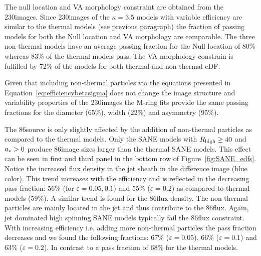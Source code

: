 
The null location and VA morphology constraint are obtained from the 230\GHz images.
Since 230\GHz images of the $\kappa=3.5$ models with variable efficiency are similar to the thermal models (see previous paragraph) the fraction of passing models for both the Null location and VA morphology are comparable.
The three non-thermal models have an average passing fraction for the Null location of 80\% whereas 83\% of the thermal models pass.
The VA morphology constrain is fulfilled by 72\% of the models for both thermal and non-thermal eDF.


Given that including non-thermal particles via the equations presented in Equation~\ref{eq:efficiencybetasigma} does not change the image structure and variability properties of the 230\GHz images the M-ring fits provide the same passing fractions for the diameter (65\%), width (22\%) and asymmetry (95\%).


The 86\GHz source is only slightly affected by the addition of non-thermal particles as compared to the thermal models.
Only the SANE models with $R_\mathrm{high} \geq 40$ and $a_* > 0$ produce 86\GHz image sizes larger than the thermal SANE models.
This effect can be seen in  first and third panel in the bottom row of Figure~\ref{fig:SANE_edfs}.
Notice the increased flux density in the jet sheath in the difference image (blue color).
This trend increases with the efficiency and is reflected in the decreasing pass fraction: 56\% (for $\varepsilon=0.05,0.1$) and 55\% ($\varepsilon=0.2$) as compared to thermal models (59\%).
A similar trend is found for the 86\GHz flux density.
The non-thermal particles are mainly located in the jet and thus contribute to the 86\GHz flux.
Again, jet dominated high spinning SANE models typically fail the 86\GHz flux constraint.
With increasing efficiency i.e.
adding more non-thermal particles the pass fraction decreases and we found the following fractions: 67\% ($\varepsilon=0.05$), 66\% ($\varepsilon=0.1$) and 63\% ($\varepsilon=0.2$).
In contrast to a pass fraction of 68\% for the thermal models.

